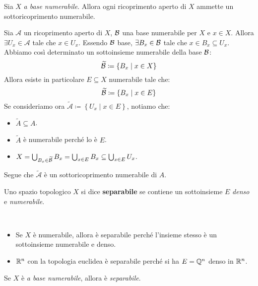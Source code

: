 \begin{proposition}
Sia $X$ \textit{a base numerabile}. Allora ogni ricoprimento aperto di $X$ ammette un sottoricoprimento numerabile.
\end{proposition}
\begin{demonstration}
Sia $\mathcal{A}$ un ricoprimento aperto di $X$, $\mathcal{B}$ una base numerabile per $X$ e $x\in X$. Allora $\exists U_x\in\mathcal{A}$ tale che $x\in U_x$. Essendo $\mathcal{B}$ base, $\exists B_x\in\mathcal{B}$ tale che $x\in B_x\subseteq U_x$.\\
Abbiamo così determinato un sottoinsieme numerabile della base $\mathcal{B}$:
\begin{equation*}
\widetilde{\mathcal{B}}\coloneqq\left\{B_x\mid x\in X\right\}
\end{equation*}
Allora esiste in particolare $E\subseteq X$ numerabile tale che:
\begin{equation*}
\widetilde{\mathcal{B}}\coloneqq\left\{B_x\mid x\in E\right\}
\end{equation*}
Se consideriamo ora $\widetilde{\mathcal{A}}\coloneqq\left\{U_x\mid x\in E\right\}$, notiamo che:
\begin{itemize}
	\item $\widetilde{A}\subseteq A$.
	\item $\widetilde{A}$ è numerabile perché lo è $E$.
	\item $X=\mathop{{\bigcup}}\displaylimits_{B_x\in\widetilde{\mathcal{B}}}B_x=\mathop{{\bigcup}}\displaylimits_{x\in E}B_x\subseteq \mathop{{\bigcup}}\displaylimits_{x\in E}U_x $.
\end{itemize}
Segue che $\widetilde{\mathcal{A}}$ è un sottoricoprimento numerabile di $A$.
\end{demonstration}
\begin{define}
Uno spazio topologico $X$ si dice \textbf{separabile} se contiene un sottoinsieme $E$ \textit{denso} e \textit{numerabile}.
\end{define}
\begin{examples}~{}
	\begin{itemize}
		\item Se $X$ è numerabile, allora è separabile perché l'insieme stesso è un sottoinsieme numerabile e denso.
		\item $\mathbb{R}^n$ con la topologia euclidea è separabile perché si ha $E=\mathbb{Q}^n$ denso in $\mathbb{R}^n$.
	\end{itemize}
\end{examples}
\begin{lemming}\label{basenumseparabile}
Se $X$ è \textit{a base numerabile}, allora è \textit{separabile}.
\end{lemming}
